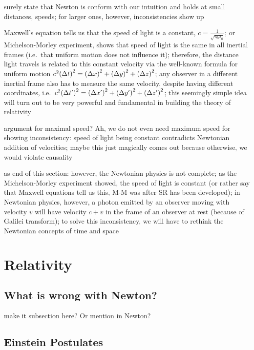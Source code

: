 surely state that Newton is conform with our intuition and holds at small distances, speeds; for larger ones, however, inconsistencies show up



Maxwell's equation tells us that the speed of light is a constant, $c = \frac{1}{\sqrt{\epsilon_0 \mu_0}}$; or Michelson-Morley experiment, shows that speed of light is the same in all inertial frames (i.e.~that uniform motion does not influence it); therefore, the distance light travels is related to this constant velocity via the well-known formula for uniform motion $c^2 \qty(\Delta t)^2 = \qty(\Delta x)^2 + \qty(\Delta y)^2 + \qty(\Delta z)^2$; any observer in a different inertial frame also has to measure the same velocity, despite having different coordinates, i.e.~$c^2 \qty(\Delta t')^2 = \qty(\Delta x')^2 + \qty(\Delta y')^2 + \qty(\Delta z')^2$; this seemingly simple idea will turn out to be very powerful and fundamental in building the theory of relativity

argument for maximal speed? Ah, we do not even need maximum speed for showing inconsistency: speed of light being constant contradicts Newtonian addition of velocities; maybe this just magically comes out because otherwise, we would violate causality



as end of this section: however, the Newtonian physics is not complete; as the Michelson-Morley experiment showed, the speed of light is constant (or rather say that Maxwell equations tell us this, M-M was after SR has been developed); in Newtonian physics, however, a photon emitted by an observer moving with velocity $v$ will have velocity $c + v$ in the frame of an observer at rest (because of Galilei transform); to solve this inconsistency, we will have to rethink the Newtonian concepts of time and space



\newpage



	\section{Relativity}
		\subsection{What is wrong with Newton?}
make it subsection here? Or mention in Newton?



		\subsection{Einstein Postulates}

